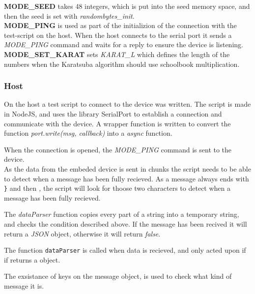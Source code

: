\textbf{MODE\_SEED} takes 48 integers, which is put into the seed memory space, and then the seed is set with \textit{randombytes\_init}.\\


\textbf{MODE\_PING} is used as part of the initializion of the connection with the test-script on the host. When the host connects to the serial port it sends a \textit{MODE\_PING} command and waits for a reply to ensure the device is listening.\\


\textbf{MODE\_SET\_KARAT} sets \textit{KARAT\_L} which defines the length of the numbers when the Karatsuba algorithm should use schoolbook multiplication.\\


\subsubsection{Host}
On the host a test script to connect to the device was written. The script is made in NodeJS\cite{nodejs}, and uses the library SerialPort\cite{serialport} to establish a connection and communicate with the device.
A wrapper function is written to convert the function \textit{port.write(msg, callback)} into a \textit{async} function. 


When the connection is opened, the \textit{MODE\_PING} command is sent to the device.\\


As the data from the embeded device is sent in chunks the script needs to be able to detect when a message has been fully recieved. As a message always ends with \texttt{\}} and then \textit{,} the script will look for thoose two characters to detect when a message has been fully recieved.

The \textit{dataParser} function copies every part of a string into a temporary string, and checks the condition described above. If the message has been recived it will return a \textit{JSON} object, otherwise it will return \textit{false}.

The function \texttt{dataParser} is called when data is recieved, and only acted upon if if returns a object.  

The exsistance of keys on the message object, is used to check what kind of message it is.

